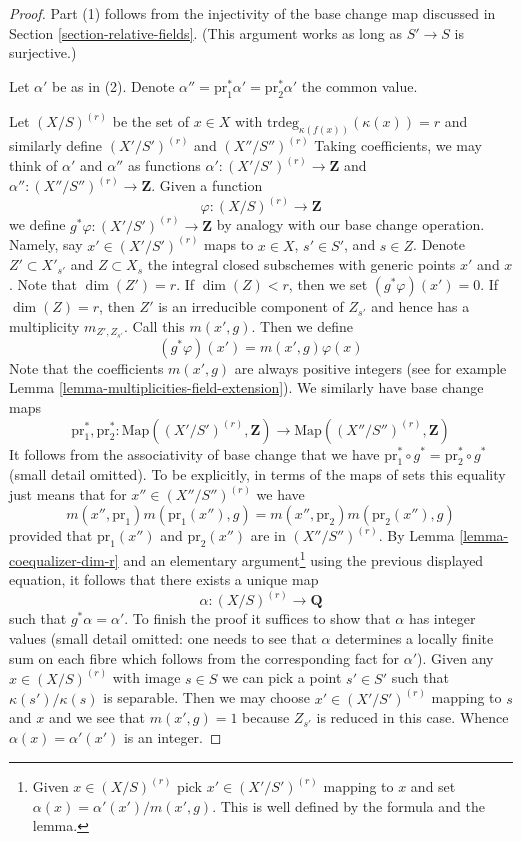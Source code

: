 \begin{proof}
Part (1) follows from the injectivity of the base change map discussed
in Section \ref{section-relative-fields}. (This argument works as
long as $S' \to S$ is surjective.)

\medskip\noindent
Let $\alpha'$ be as in (2). Denote
$\alpha'' = \text{pr}_1^*\alpha' = \text{pr}_2^*\alpha'$
the common value.

\medskip\noindent
Let $(X/S)^{(r)}$ be the set of $x \in X$ with
$\text{trdeg}_{\kappa(f(x))}(\kappa(x)) = r$
and similarly define $(X'/S')^{(r)}$ and $(X''/S'')^{(r)}$
Taking coefficients, we may think of $\alpha'$ and $\alpha''$ as functions
$\alpha' : (X'/S')^{(r)} \to \mathbf{Z}$ and
$\alpha'' : (X''/S'')^{(r)} \to \mathbf{Z}$.
Given a function
$$
\varphi : (X/S)^{(r)} \to \mathbf{Z}
$$
we define $g^*\varphi : (X'/S')^{(r)} \to \mathbf{Z}$ by analogy
with our base change operation. Namely, say $x' \in (X'/S')^{(r)}$
maps to $x \in X$, $s' \in S'$, and $s \in Z$.
Denote $Z' \subset X'_{s'}$ and $Z \subset X_s$ the integral
closed subschemes with generic points $x'$ and $x$. Note
that $\dim(Z') = r$. If $\dim(Z) < r$, then we set $(g^*\varphi)(x') = 0$.
If $\dim(Z) = r$, then $Z'$ is an irreducible component of $Z_{s'}$ and
hence has a multiplicity $m_{Z', Z_{s'}}$. Call this $m(x', g)$.
Then we define
$$
(g^*\varphi)(x') = m(x', g) \varphi(x)
$$
Note that the coefficients $m(x', g)$ are always positive integers
(see for example Lemma \ref{lemma-multiplicities-field-extension}).
We similarly have base change maps
$$
\text{pr}_1^*, \text{pr}_2^* :
\text{Map}((X'/S')^{(r)}, \mathbf{Z})
\longrightarrow
\text{Map}((X''/S'')^{(r)}, \mathbf{Z})
$$
It follows from the associativity of base change that we have
$\text{pr}_1^* \circ g^* = \text{pr}_2^* \circ g^*$ (small detail
omitted). To be explicitly, in terms of the maps of sets this
equality just means that for $x'' \in (X''/S'')^{(r)}$ we have
$$
m(x'', \text{pr}_1) m(\text{pr}_1(x''), g) =
m(x'', \text{pr}_2) m(\text{pr}_2(x''), g)
$$
provided that $\text{pr}_1(x'')$ and $\text{pr}_2(x'')$ are
in $(X''/S'')^{(r)}$.
By Lemma \ref{lemma-coequalizer-dim-r} and an elementary
argument\footnote{Given $x \in (X/S)^{(r)}$ pick $x' \in (X'/S')^{(r)}$
mapping to $x$ and set $\alpha(x) = \alpha'(x')/m(x', g)$. This
is well defined by the formula and the lemma.}
using the previous displayed equation,
it follows that there exists a unique map
$$
\alpha : (X/S)^{(r)} \to \mathbf{Q}
$$
such that $g^*\alpha = \alpha'$. To finish the proof it suffices
to show that $\alpha$ has integer values (small detail omitted: one
needs to see that $\alpha$ determines a locally finite sum on
each fibre which follows from the corresponding fact for $\alpha'$).
Given any $x \in (X/S)^{(r)}$ with image $s \in S$
we can pick a point $s' \in S'$ such that $\kappa(s')/\kappa(s)$
is separable. Then we may choose $x' \in (X'/S')^{(r)}$ mapping
to $s$ and $x$ and we see that $m(x', g) = 1$ because
$Z_{s'}$ is reduced in this case. Whence $\alpha(x) = \alpha'(x')$
is an integer.
\end{proof}

